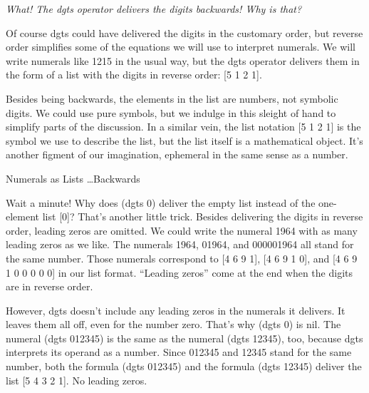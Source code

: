 \begin{aside}
\emph{What! The \textsf{dgts} operator delivers the digits backwards! Why is that?}

Of course
\textsf{dgts}
could have delivered the digits in the
customary order, but reverse order simplifies some of the
equations we will use to interpret numerals.
We will write numerals like 1215 in the usual way, but
the \textsf{dgts} operator delivers them in the form of
a list with the digits in reverse order: \textsf{[5 1 2 1]}.

Besides being backwards, the elements in the list are numbers,
not symbolic digits.
We could use pure symbols, but we indulge in
this sleight of hand to
simplify parts of the discussion.
In a similar vein, the list notation \textsf{[5 1 2 1]} is the symbol we use
to describe the 
list,
but the list itself is a mathematical object.
It's another figment of our imagination,
ephemeral in the same sense as a number.
\caption{Numerals as Lists \dots Backwards}
\label{numeral-as-sequence}
\end{aside}

Wait a minute!
Why does \textsf{(dgts 0)} deliver the empty list
instead of the one-element list \textsf{[0]}?
That's another little trick.
Besides delivering the digits in reverse order,
leading zeros are omitted.
We could write the numeral 1964 with as many leading zeros as we like.
The numerals 1964, 01964, and 000001964 all stand for the same number.
Those numerals correspond to
\textsf{[4 6 9 1]}, \textsf{[4 6 9 1 0]}, and \textsf{[4 6 9 1 0 0 0 0 0]}
in our list format. ``Leading zeros'' come at the end when the
digits are in reverse order.

However, \textsf{dgts} doesn't include any
 leading zeros
in the numerals it delivers.
It leaves them all off, even for the number zero.
That's why \textsf{(dgts 0)} is \textsf{nil}.
The numeral \textsf{(dgts 012345)} is
the same as the numeral \textsf{(dgts 12345)}, too,
because \textsf{dgts} interprets its operand as a number.
Since 012345 and 12345 stand for the same number,
both the formula \textsf{(dgts 012345)} and the formula \textsf{(dgts 12345)}
deliver the list \textsf{[5 4 3 2 1]}.
No leading zeros.

